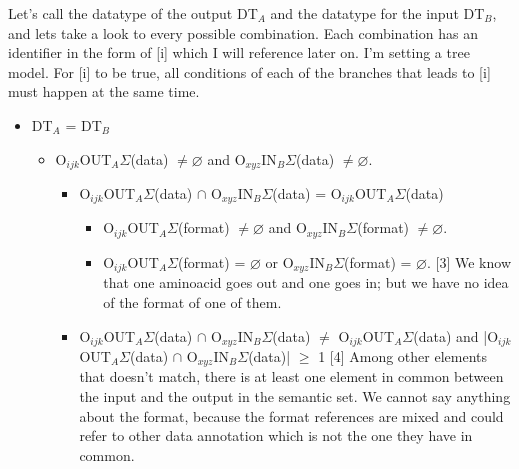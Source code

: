 \documentclass[a4paper,10pt]{article}
\begin{document}
  Let's call the datatype of the output DT$_{A}$ and the datatype for the input DT$_{B}$, and lets take a look to every possible combination. Each combination has an identifier in the form of [i] which I will reference later on. I'm setting a tree model. For [i] to be true, all conditions of each of the branches that leads to [i] must happen at the same time.

  \begin{itemize}
  \item DT$_{A}$  = DT$_{B}$
    \begin{itemize}
    \item O$_{ijk}$OUT$_{A}\Sigma$(data) $\neq \varnothing$ and O$_{xyz}$IN$_{B}\Sigma$(data) $\neq \varnothing$.
      \begin{itemize}
      \item O$_{ijk}$OUT$_{A}\Sigma$(data) $\cap$ O$_{xyz}$IN$_{B}\Sigma$(data) = O$_{ijk}$OUT$_{A}\Sigma$(data)
	\begin{itemize}
	\item O$_{ijk}$OUT$_{A}\Sigma$(format) $\neq \varnothing$ and O$_{xyz}$IN$_{B}\Sigma$(format) $\neq \varnothing$.
	\item O$_{ijk}$OUT$_{A}\Sigma$(format) = $\varnothing$ or O$_{xyz}$IN$_{B}\Sigma$(format) = $\varnothing$. [3]
	We know that one aminoacid goes out and one goes in; but we have no idea of the format of one of them.
	\end{itemize}
      \item O$_{ijk}$OUT$_{A}\Sigma$(data) $\cap$ O$_{xyz}$IN$_{B}\Sigma$(data) $\neq$ O$_{ijk}$OUT$_{A}\Sigma$(data) and |O$_{ijk}$OUT$_{A}\Sigma$(data) $\cap$ O$_{xyz}$IN$_{B}\Sigma$(data)| $\geq$ 1 [4]
      Among other elements that doesn't match, there is at least one element in common between the input and the output in the semantic set. We cannot say anything about the format, because the format references are mixed and could refer to other data annotation which is not the one they have in common.

\end{itemize}
\end{itemize}
\end{itemize}
\end{document}
